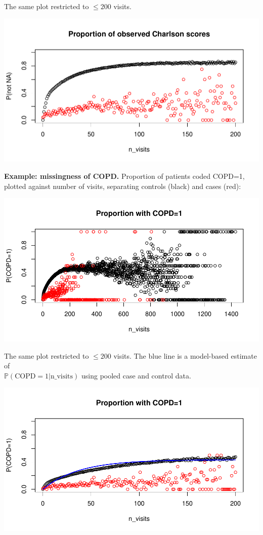 \documentclass[12pt]{article}
\begin{document}
The same plot restricted to $\leq 200$ visits.

\begin{center}
\includegraphics[width=.6\textwidth]{nvisits_scatter200.pdf}
\end{center}

{\bf Example: missingness of COPD.} Proportion of patients coded COPD=1, plotted against number of visits, separating controls (black) and cases (red):

\begin{center}
\includegraphics[width=.6\textwidth]{nvisits_scatterCOPD.pdf}
\end{center}

The same plot restricted to $\leq 200$ visits. The blue line is a model-based estimate of \\ $\mathbb{P}(\text{COPD}=1 | \text{n\_visits})$ using pooled case and control data.

\begin{center}
\includegraphics[width=.6\textwidth]{nvisits_scatterCOPD200.pdf}
\end{center}
\end{document}

